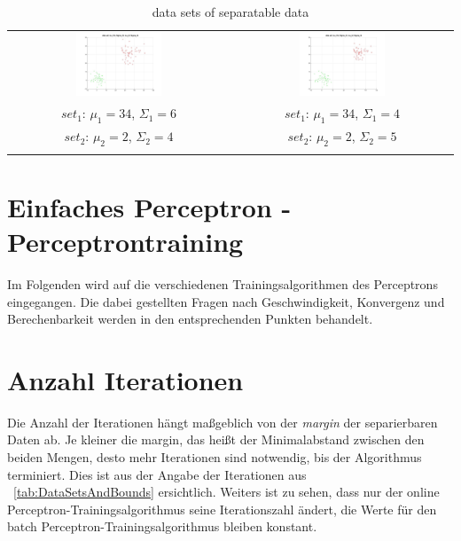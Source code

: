 \documentclass[]{report}
\begin{document}
\begin{table}[h]
\begin{tabular}{| c | c |}
\includegraphics[width=0.4\textwidth]{./images/DataSet_300.jpg} & \includegraphics[width=0.4\textwidth]{./images/DataSet_400.jpg} \\
$set_1$: $\mu_1=34$, $\Sigma_1=6$ & $set_1$: $\mu_1=34$, $\Sigma_1=4$ \\
$set_2$: $\mu_2=2$, $\Sigma_2=4$ & $set_2$: $\mu_2=2$, $\Sigma_2=5$ \\
 & \\
\hline
\end{tabular}
\caption{data sets of separatable data}
\label{tab:DataSets}
\end{table}

\section{Einfaches Perceptron - Perceptrontraining}

Im Folgenden wird auf die verschiedenen Trainingsalgorithmen des Perceptrons eingegangen. Die dabei gestellten Fragen nach Geschwindigkeit, Konvergenz und Berechenbarkeit werden in den entsprechenden Punkten behandelt.

\section{Anzahl Iterationen}

Die Anzahl der Iterationen h\"angt ma{\ss}geblich von der \emph{margin} der separierbaren Daten ab. Je kleiner die margin, das hei{\ss}t der Minimalabstand zwischen den beiden Mengen, desto mehr Iterationen sind notwendig, bis der Algorithmus terminiert. Dies ist aus der Angabe der Iterationen aus ~\ref{tab:DataSetsAndBounds} ersichtlich. Weiters ist zu sehen, dass nur der online Perceptron-Trainingsalgorithmus seine Iterationszahl \"andert, die Werte f\"ur den batch Perceptron-Trainingsalgorithmus bleiben konstant.
\end{document}
